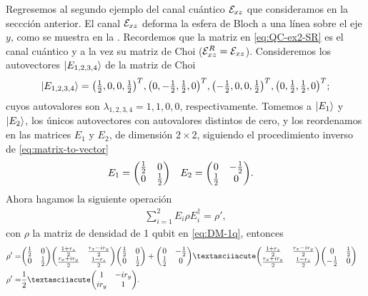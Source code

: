 
Regresemos al segundo ejemplo del canal cuántico $\mathcal{E}_{xz}$ que consideramos 
en la seccción anterior. El canal $\mathcal{E}_{xz}$ deforma la esfera de Bloch
a una línea sobre el eje $y$, como se muestra en la \Fref{}. 
Recordemos que la matriz en \eqref{eq:QC-ex2-SR} es el canal cuántico
y a la vez su matriz de Choi ($\mathcal{E}_{xz}^R=\mathcal{E}_{xz}$). 
Consideremos los autovectores $\ket{E_{1,2,3,4}}$ de la matriz de Choi
\begin{align}
\ket{E_{1,2,3,4}}=
\mqty(\frac{1}{2},0,0,\frac{1}{2})^T,
\mqty(0,-\frac{1}{2},\frac{1}{2},0)^T,
\mqty(-\frac{1}{2},0,0,\frac{1}{2})^T,
\mqty(0,\frac{1}{2},\frac{1}{2},0)^T;
\end{align}
cuyos autovalores son $\lambda_{1,2,3,4}=1,1,0,0$, respectivamente.
Tomemos a $\ket{E_1}$ y $\ket{E_2}$, los únicos autovectores
con autovalores distintos de cero, y los reordenamos en 
las matrices $E_1$ y $E_2$, de dimensión $2\times2$, siguiendo 
el procedimiento inverso de \eqref{eq:matrix-to-vector}
\begin{align}
E_1&=
\mqty(
\frac{1}{2} & 0\\
0 & \frac{1}{2}
)
&
E_2&=
\mqty(
0 & -\frac{1}{2}\\
\frac{1}{2} & 0
).
\end{align}
Ahora hagamos la siguiente operación
\begin{align}
\sum_{i=1}^2E_i\rho E_i^{\dagger}=\rho',
\label{eq:almost-Kraus}
\end{align}
con $\rho$ la matriz de densidad de 1 qubit en \eqref{eq:DM-1q}, entonces
\begin{align}
\rho'=&
\mqty(
\frac{1}{2} & 0\\
0 & \frac{1}{2}
)
\mqty(
\frac{1+r_z}{2}& \frac{r_x-ir_y}{2}\\
\frac{r_x+ir_y}{2} & \frac{1-r_z}{2}
)
\mqty(
\frac{1}{2} & 0\\
0 & \frac{1}{2}
)
+
\mqty(
0 & -\frac{1}{2}\\
\frac{1}{2} & 0
)´
\mqty(
\frac{1+r_z}{2}& \frac{r_x-ir_y}{2}\\
\frac{r_x+ir_y}{2} & \frac{1-r_z}{2}
)
\mqty(
0 & \frac{1}{2}\\
-\frac{1}{2} & 0
)&
\nonumber\\
\rho'=&
\frac{1}{2}´
\mqty(
1 & -ir_y\\
ir_y & 1
).
\label{eq:QC-ex2-KR}
\end{align}
